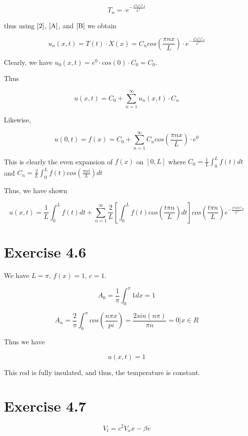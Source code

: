 \documentclass{article}
\begin{document}
\begin{equation}\label{B}
T_n = \cdot e^{-\frac{\pi^2 n^2 c^2}{L^2} t}
\end{equation}

thus using $\eqref{2}$, $\eqref{A}$, and $\eqref{B}$ we obtain


$$
u_n(x,t) = T(t) \cdot X(x) = C_n cos(\frac{\pi n x}{L}) \cdot e^{-\frac{\pi^2 n^2 c^2}{L^2} t}
$$

Clearly, we have $u_0(x,t) = e^0 \cdot cos(0) \cdot C_0 = C_0$.

Thus

$$ u(x,t) = C_0 + \sum_{n=1}^{\infty} u_n(x,t) \cdot C_n $$

Likewise,

$$ u(0,t) = f(x) = C_0 + \sum_{n=1}^{\infty} C_n cos\left(\frac{\pi n x}{L} \right) \cdot e^0$$

This is clearly the even expansion of $f(x)$ on $[0,L]$ where $C_0 = \frac{1}{L} \int_0^L f(t)dt$ and $C_n = \frac{2}{L} \int_0^{L} f(t) cos\left(\frac{\pi n t}{L}\right) dt$

Thus, we have shown

$$
u(x,t) = \frac{1}{L} \int_0^L f(t) dt + \sum_{n=1}^{\infty} \frac {2}{L} \left[ \int_0^L f(t) cos\left(\frac{t \pi n}{L}\right)  dt \right] cos\left(\frac{t \pi n}{L}\right) e^{-\frac{\pi^2 n^2 c^2}{L^2} t}
$$



\section*{Exercise 4.6}

We have $L=\pi$, $f(x)=1$, $c=1$.

$$
A_0 = \frac{1}{\pi} \int_0^{\pi} 1dx = 1
$$

$$
A_n = \frac{2}{\pi} \int_0^{\pi} cos\left(\frac{n \pi x}{pi}\right) = \frac{2sin(n \pi)}{\pi n} = 0\Bigr| x \in R
$$

Thus we have

$$
u(x,t) = 1
$$

This rod is fully insulated, and thus, the temperature is constant.

\section*{Exercise 4.7}

\begin{equation}\label{10}
V_t = c^2 V_xx- \beta v
\end{equation}
\end{document}
